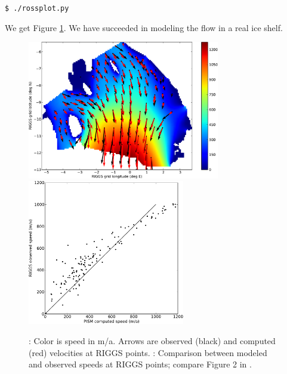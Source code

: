 \documentclass[11pt,final]{amsart}
\begin{document}
\verb|$ ./rossplot.py|

\noindent We get Figure \ref{fig:rosspython}.  We have succeeded in modeling the flow in a real ice shelf.

\begin{figure}[ht]
\mbox{\includegraphics[width=3.3in,keepaspectratio=true]{rossquiver}\quad \includegraphics[width=2.7in,keepaspectratio=true]{rossscatter}}
\caption{: Color is speed in m/a.  Arrows are observed (black) and computed (red) velocities at RIGGS points.  : Comparison between modeled and observed speeds at RIGGS points; compare Figure 2 in \cite{MacAyealetal}.}
\label{fig:rosspython}
\end{figure}



\clearpage\newpage



\appendix

\newcommand{\subsect}[1]{\bigskip\subsection{#1}\rule{0mm}{2mm}\par\medskip}
\newcommand{\subsectstar}[1]{\bigskip\noindent\textbf{#1.}\rule{0mm}{2mm}\par\medskip}
\newcommand{\subsubsect}[1]{\subsubsection{#1}\rule{0mm}{2mm}\par\smallskip}
\end{document}
